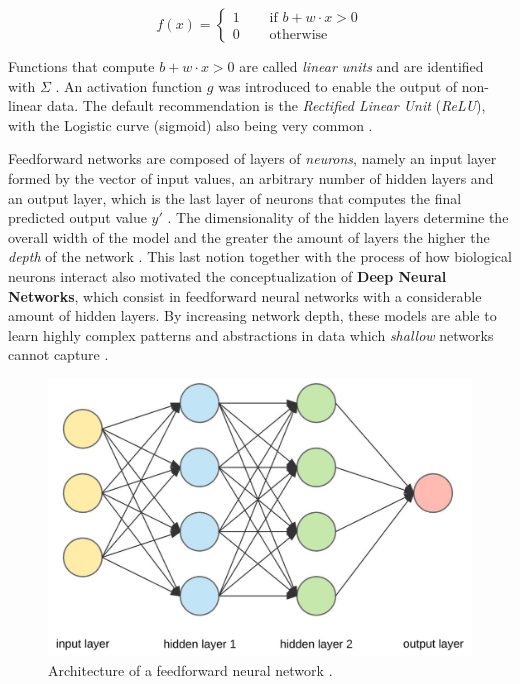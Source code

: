 \begin{equation} \label{eq:perceptron}
	f(x) =
	\left\{ \begin{aligned} 
		1 &\quad \text{ if } b + w \cdot x > 0\\
		0 &\quad \text{ otherwise} 
	\end{aligned} \right.
\end{equation}

Functions that compute $b + w \cdot x > 0$ are called \textit{linear units} and are identified with $\Sigma$ \cite{charniakIntroductionDeepLearning2018, goodfellowDeepLearning2016}. An activation function $g$ was introduced to enable the output of non-linear data. The default recommendation is the \textit{Rectified Linear Unit} (\textit{ReLU}), with the Logistic curve (sigmoid) also being very common \cite{goodfellowDeepLearning2016}.  \par
Feedforward networks are composed of layers of \textit{neurons}, namely an input layer formed by the vector of input values, an arbitrary number of hidden layers and an output layer, which is the last layer of neurons that computes the final predicted output value $y'$ \cite{charniakIntroductionDeepLearning2018}. The dimensionality of the hidden layers determine the overall width of the model and the greater the amount of layers the higher the \textit{depth} of the network \cite{charniakIntroductionDeepLearning2018, goodfellowDeepLearning2016}. This last notion together with the process of how biological neurons interact also motivated the conceptualization of \textbf{Deep Neural Networks}, which consist in feedforward neural networks with a considerable amount of hidden layers. By increasing network depth, these models are able to learn highly complex patterns and abstractions in data which \textit{shallow} networks cannot capture \cite{goodfellowDeepLearning2016}. \par

\begin{figure}[H]
	\centering
	\includegraphics[width=0.70\linewidth]{./figures/fnn.jpg}
	\caption{Architecture of a feedforward neural network \cite{FeedforwardNeuralNetwork}.}
	\label{fig:fnn}
\end{figure}

